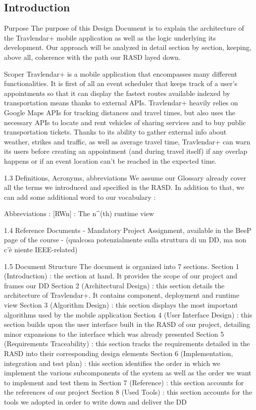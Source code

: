 \subsection {Introduction}

Purpose 
The purpose of this Design Document is to explain the architecture of the Travlendar+ mobile application as well as the logic underlying its development. Our approach will be analyzed in detail section by section, keeping, above all, coherence with the path our RASD layed down.

Scoper
Travlendar+ is a mobile application that encompasses many different functionalities. 
It is first of all an event scheduler that keeps track of a user’s appointments so that it can display the fastest routes available indexed by transportation means thanks to external APIs.
Travlendar+ heavily relies on Google Maps APIs for tracking distances and travel times, but also uses the necessary APIs to locate and rent vehicles of sharing services and to buy public transportation tickets. Thanks to its ability to gather external info about weather, strikes and traffic, as well as average travel time, Travlendar+ can warn its users before creating an appointment (and during travel itself) if any overlap happens or if an event location can’t be reached in the expected time.

1.3 Definitions, Acronyms, abbreviations
We assume our Glossary already cover all the terms we introduced and specified in the RASD. In addition to that, we can add some additional word to our vocabulary :

Abbreviations :
[RWn] : The n^(th) runtime view

1.4 Reference Documents
- Mandatory Project Assignment, available in the BeeP page of the course
- (qualcosa potenzialmente sulla struttura di un DD, ma non c’è niente IEEE-related)

1.5 Document Structure
The document is organized into 7 sections.
Section 1  (Introduction) : the section at hand. It provides the scope of our project and frames our DD
Section 2 (Architectural Design) :  this section details the architecture of Travlendar+. It contains component, deployment and runtime view
Section 3 (Algorithm Design) :   this section displays the most important algorithms used by the mobile application
Section 4 (User Interface Design) : this section  builds upon the user interface built in the RASD of our project, detailing minor expansions to the interface which was already presented
Section 5 (Requirements Traceability) : this section tracks the requirements detailed in the RASD into their corresponding design elements
Section 6 (Implementation, integration and test plan) : this section identifies the order in which we implement the various subcomponents of the system as well as the order we want to implement and test them in
Section  7 (Reference) : this section accounts for the references of our project
Section 8 (Used Tools) : this section accounts for the tools we adopted in order to write down and deliver the DD
